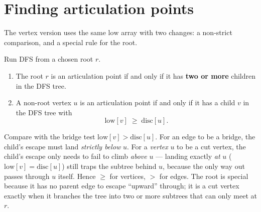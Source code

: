 \section{Finding articulation points}
\label{ch10:artic}

The vertex version uses the same $\mathrm{low}$ array with two changes: a non-strict
comparison, and a special rule for the root.

\begin{theorem}
\label{ch10:thm-artic}
Run DFS from a chosen root $r$.
\begin{enumerate}
  \item The root $r$ is an articulation point if and only if it has \textbf{two or more}
        children in the DFS tree.
  \item A non-root vertex $u$ is an articulation point if and only if it has a child
        $v$ in the DFS tree with
        \[
          \mathrm{low}[v] \;\ge\; \mathrm{disc}[u].
        \]
\end{enumerate}
\end{theorem}

\begin{intuitionbox}
Compare with the bridge test $\mathrm{low}[v]>\mathrm{disc}[u]$. For an edge to be a
bridge, the child's escape must land \emph{strictly below} $u$. For a \emph{vertex}
$u$ to be a cut vertex, the child's escape only needs to fail to climb \emph{above}
$u$ --- landing exactly \emph{at} $u$ ($\mathrm{low}[v]=\mathrm{disc}[u]$) still traps
the subtree behind $u$, because the only way out passes through $u$ itself. Hence
$\ge$ for vertices, $>$ for edges. The root is special because it has no parent edge to
escape ``upward'' through; it is a cut vertex exactly when it branches the tree into
two or more subtrees that can only meet at $r$.
\end{intuitionbox}

